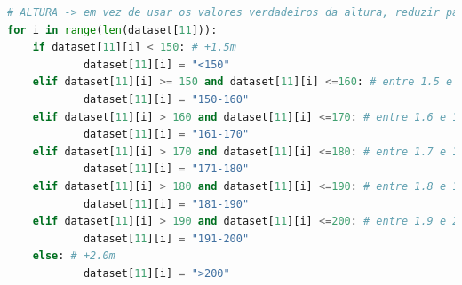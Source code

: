 \begin{lstlisting}[caption={Excerto de código utilizado para substituir todos os valores numericos da categoria 'Height (cm)' por valores categoricos.}, language=Python, label={codigo:data_disc}]
# ALTURA -> em vez de usar os valores verdadeiros da altura, reduzir para algumas categorias genericas
for i in range(len(dataset[11])):
    if dataset[11][i] < 150: # +1.5m
			dataset[11][i] = "<150"
    elif dataset[11][i] >= 150 and dataset[11][i] <=160: # entre 1.5 e 1.6 m
			dataset[11][i] = "150-160"
    elif dataset[11][i] > 160 and dataset[11][i] <=170: # entre 1.6 e 1.7 m
			dataset[11][i] = "161-170"
    elif dataset[11][i] > 170 and dataset[11][i] <=180: # entre 1.7 e 1.8 m
			dataset[11][i] = "171-180"
    elif dataset[11][i] > 180 and dataset[11][i] <=190: # entre 1.8 e 1.9 m
			dataset[11][i] = "181-190"
    elif dataset[11][i] > 190 and dataset[11][i] <=200: # entre 1.9 e 2.0 m
			dataset[11][i] = "191-200"
    else: # +2.0m
			dataset[11][i] = ">200"
\end{lstlisting}
